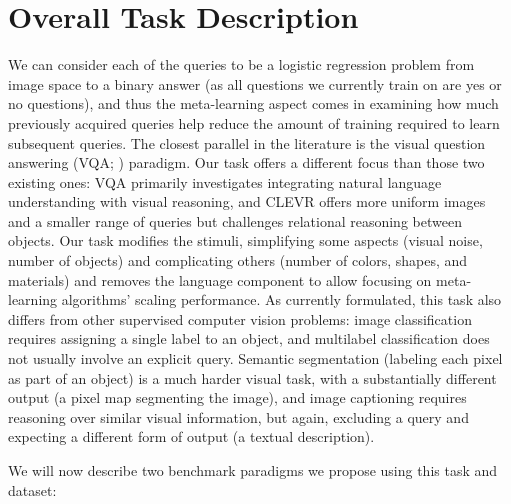 \section{Overall Task Description}
We can consider each of the queries to be a logistic regression problem from image space to a binary answer (as all questions we currently train on are yes or no questions), and thus the meta-learning aspect comes in examining how much previously acquired queries help reduce the amount of training required to learn subsequent queries. The closest parallel in the literature is the visual question answering (VQA; \cite{Antol2015}) paradigm. Our task offers a different focus than those two existing ones: VQA primarily investigates integrating natural language understanding with visual reasoning, and CLEVR offers more uniform images and a smaller range of queries but challenges relational reasoning between objects. Our task modifies the stimuli, simplifying some aspects (visual noise, number of objects) and complicating others (number of colors, shapes, and materials) and removes the language component to allow focusing on meta-learning algorithms’ scaling performance. As currently formulated, this task also differs from other supervised computer vision problems: image classification requires assigning a single label to an object, and multilabel classification does not usually involve an explicit query. Semantic segmentation (labeling each pixel as part of an object) is a much harder visual task, with a substantially different output (a pixel map segmenting the image), and image captioning requires reasoning over similar visual information, but again, excluding a query and expecting a different form of output (a textual description).

We will now describe two benchmark paradigms we propose using this task and dataset:

